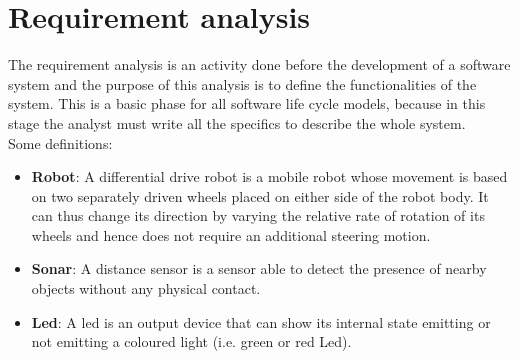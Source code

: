\section{Requirement analysis}
The requirement analysis is an activity done before the development of a software system and the purpose of this analysis is to define the functionalities of the system. This is a basic phase for all software life cycle models, because in this stage the analyst must write all the specifics to describe the whole system. \\
Some definitions:
\begin{itemize}
	\item \textbf{Robot}: A differential drive robot is a mobile robot whose movement is based on two separately driven wheels placed on either side of the robot body. It can thus change its direction by varying the relative rate of rotation of its wheels and hence does not require an additional steering motion.
	\item \textbf{Sonar}: A distance sensor is a sensor able to detect the presence of nearby objects without any physical contact.
	\item \textbf{Led}: A led is an output device that can show its internal state emitting or not emitting a coloured light (i.e. green or red Led).
\end{itemize}



